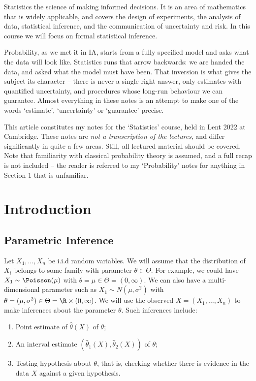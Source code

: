 



Statistics the science of making informed decisions. It is an area of mathematics that is widely applicable, and covers the design of experiments, the analysis of data, statistical inference, and the communication of uncertainty and risk.
In this course we will focus on formal statistical inference.

Probability, as we met it in IA, starts from a fully specified model and asks what the data will look like. Statistics runs that arrow backwards: we are handed the data, and asked what the model must have been. That inversion is what gives the subject its character -- there is never a single right answer, only estimates with quantified uncertainty, and procedures whose long-run behaviour we can guarantee. Almost everything in these notes is an attempt to make one of the words `estimate', `uncertainty' or `guarantee' precise.

This article constitutes my notes for the `Statistics' course, held in Lent 2022 at Cambridge. These notes are \emph{not a transcription of the lectures}, and differ significantly in quite a few areas. Still, all lectured material should be covered.
Note that familiarity with classical probability theory is assumed, and a full recap is not included -- the reader is referred to my `Probability' notes for anything in Section 1 that is unfamiliar.




\section{Introduction}

\subsection{Parametric Inference}

Let $X_1, \dots, X_n$ be i.i.d random variables. We will assume that the distribution of $X_i$ belongs to some family with parameter $\theta \in \Theta$.
For example, we could have $X_1 \sim \Poisson(\mu)$ with $\theta = \mu \in \Theta = (0, \infty)$. We can also have a multi-dimensional parameter such as $X_1 \sim N(\mu, \sigma^2)$ with $\theta = (\mu, \sigma^2) \in \Theta = \R \times (0, \infty)$.
We will use the observed $X = (X_1, \dots, X_n)$ to make inferences about the parameter $\theta$. Such inferences include:

\begin{enumerate}
  \item Point estimate of $\hat{\theta}(X)$ of $\theta$;
  \item An interval estimate $(\hat{\theta}_1(X), \hat{\theta}_2(X))$ of $\theta$;
  \item Testing hypothesis about $\theta$, that is, checking whether there is evidence in the data $X$ against a given hypothesis.
\end{enumerate}

